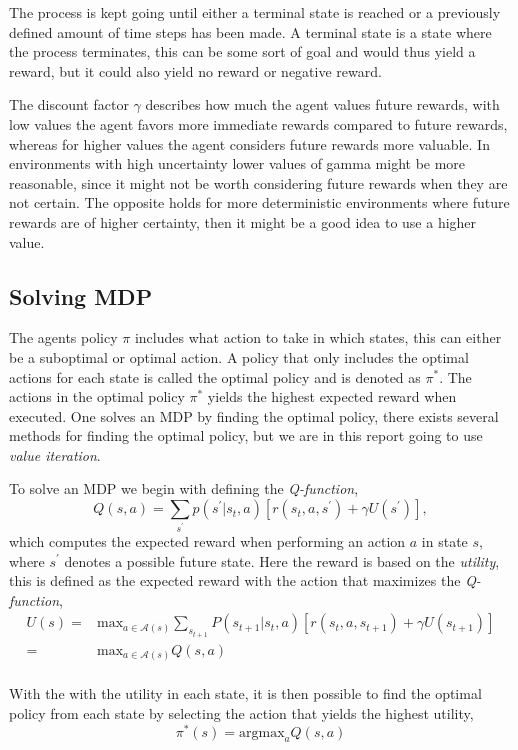 \documentclass[12pt,A4]{report}
\theoremstyle{definition}
\begin{document}
The process is kept going until either a terminal state is reached or a previously defined amount of time steps has been made. A terminal state is a state where the process terminates, this can be some sort of goal and would thus yield a reward, but it could also yield no reward or negative reward.

The discount factor $\gamma$ describes how much the agent values future rewards, with low values the agent favors more immediate rewards compared to future rewards, whereas for higher values the agent considers future rewards more valuable. In environments with high uncertainty lower values of gamma might be more reasonable, since it might not be worth considering future rewards when they are not certain. The opposite holds for more deterministic environments where future rewards are of higher certainty, then it might be a good idea to use a higher value.

\subsection{Solving MDP}
The agents policy $\pi$ includes what action to take in which states, this can either be a suboptimal or optimal action. A policy that only includes the optimal actions for each state is called the optimal policy and is denoted as $\pi^*$. The actions in the optimal policy $\pi^*$ yields the highest expected reward when executed. One solves an MDP by finding the optimal policy, there exists several methods for finding the optimal policy, but we are in this report going to use \textit{value iteration}. 

To solve an MDP we begin with defining the \textit{Q-function},
\[ Q(s, a) = \sum_{s^\prime}p(s^\prime|s_t,a)[r(s_t,a,s^\prime) + \gamma U(s^\prime)],\]
which computes the expected reward when performing an action $a$ in state $s$, where $s^\prime$ denotes a possible future state. Here the reward is based on the \textit{utility}, this is defined as the expected reward with the action that maximizes the \textit{Q-function},
\begin{align*}
  U(s) =& \text{max}_{a\in \mathcal{A}(s)} \sum_{s_{t+1}}P(s_{t+1}|s_t,a)[r(s_t,a,s_{t+1}) + \gamma U(s_{t+1})]\\
  = &  \text{max}_{a\in \mathcal{A}(s)} Q(s,a)\\
\end{align*}

With the with the utility in each state, it is then possible to find the optimal policy from each state by selecting the action that yields the highest utility,
\[ \pi^*(s) = \text{argmax}_a Q(s,a) \]
\end{document}
